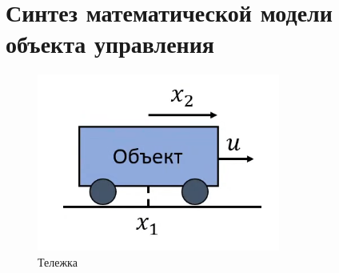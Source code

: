 \section{Синтез математической модели объекта управления}

\begin{figure}[H]
    \centering
    \includegraphics[width=0.5\linewidth]{figs/cart.png}
    \caption{Тележка}
    \label{fig:cart}
\end{figure}

